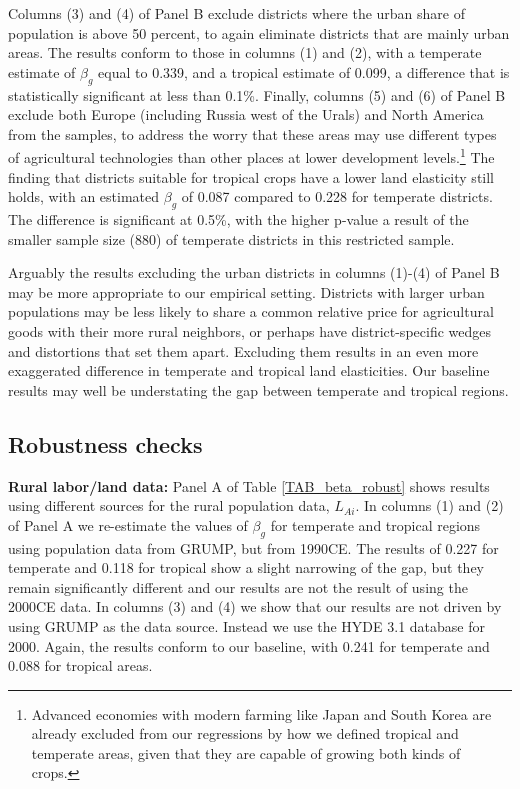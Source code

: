 \documentclass[11pt]{article}
\begin{document}
Columns (3) and (4) of Panel B exclude districts where the urban share of population is above 50 percent, to again eliminate districts that are mainly urban areas. The results conform to those in columns (1) and (2), with a temperate estimate of $\beta_g$ equal to 0.339, and a tropical estimate of 0.099, a difference that is statistically significant at less than 0.1\%. Finally, columns (5) and (6) of Panel B exclude both Europe (including Russia west of the Urals) and North America from the samples, to address the worry that these areas may use different types of agricultural technologies than other places at lower development levels.\footnote{Advanced economies with modern farming like Japan and South Korea are already excluded from our regressions by how we defined tropical and temperate areas, given that they are capable of growing both kinds of crops.} The finding that districts suitable for tropical crops have a lower land elasticity still holds, with an estimated $\beta_g$ of 0.087 compared to 0.228 for temperate districts. The difference is significant at 0.5\%, with the higher p-value a result of the smaller sample size (880) of temperate districts in this restricted sample.

Arguably the results excluding the urban districts in columns (1)-(4) of Panel B may be more appropriate to our empirical setting. Districts with larger urban populations may be less likely to share a common relative price for agricultural goods with their more rural neighbors, or perhaps have district-specific wedges and distortions that set them apart. Excluding them results in an even more exaggerated difference in temperate and tropical land elasticities. Our baseline results may well be understating the gap between temperate and tropical regions.

\subsection{Robustness checks}
\noindent\textbf{Rural labor/land data:} Panel A of Table \ref{TAB_beta_robust} shows results using different sources for the rural population data, $L_{Ai}$. In columns (1) and (2) of Panel A we re-estimate the values of $\beta_g$ for temperate and tropical regions using population data from GRUMP, but from 1990CE. The results of 0.227 for temperate and 0.118 for tropical show a slight narrowing of the gap, but they remain significantly different and our results are not the result of using the 2000CE data. In columns (3) and (4) we show that our results are not driven by using GRUMP as the data source. Instead we use the HYDE 3.1 database \citep{hyde31} for 2000. Again, the results conform to our baseline, with 0.241 for temperate and 0.088 for tropical areas. 
\end{document}
